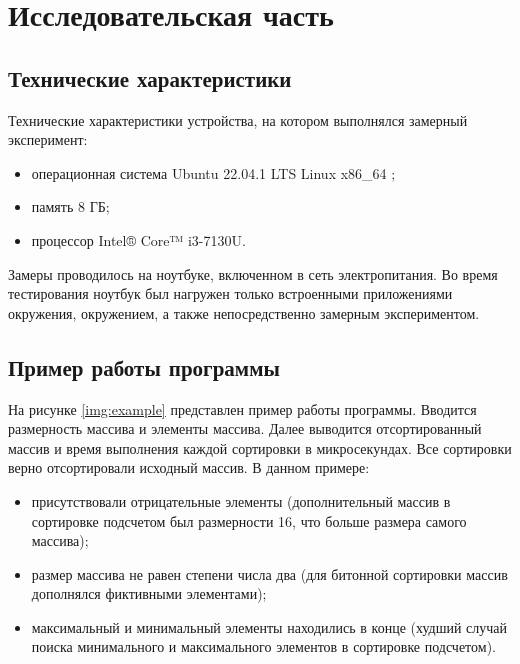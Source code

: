 \chapter{Исследовательская часть}

\section{Технические характеристики}

Технические характеристики устройства, на котором выполнялся замерный эксперимент:
\begin{itemize}
	\item операционная система Ubuntu 22.04.1 LTS Linux x86\_64 \cite{ubuntu};
	\item память 8 ГБ;
	\item процессор Intel® Core™ i3-7130U.
\end{itemize}

Замеры проводилось на ноутбуке, включенном в сеть электропитания. Во время тестирования ноутбук был нагружен только встроенными приложениями окружения, окружением, а также непосредственно замерным экспериментом.

\section{Пример работы программы}

На рисунке \ref{img:example} представлен пример работы программы. Вводится размерность массива и элементы массива. Далее выводится отсортированный массив и время выполнения каждой сортировки в микросекундах. Все сортировки верно отсортировали исходный массив. 
В данном примере:
\begin{itemize}
	\item присутствовали отрицательные элементы (дополнительный массив в сортировке подсчетом был размерности 16, что больше размера самого массива);
	\item размер массива не равен степени числа два (для битонной сортировки массив дополнялся фиктивными элементами);
	\item максимальный и минимальный элементы находились в конце (худший случай поиска минимального и максимального элементов в сортировке подсчетом).
\end{itemize} 

